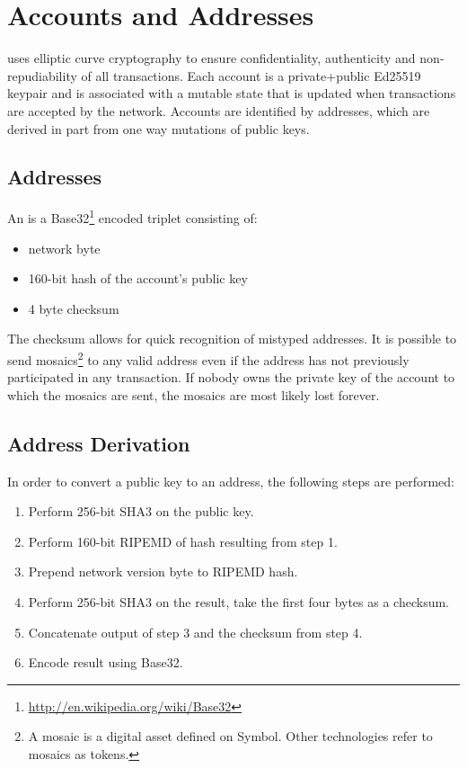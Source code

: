 \section{Accounts and Addresses}
\label{sec:accounts}


\codenamechapterfirstword uses elliptic curve cryptography to ensure confidentiality, authenticity and non-repudiability of all transactions.
Each account is a private+public Ed25519 keypair  and is associated with a mutable state that is updated when transactions are accepted by the network.
Accounts are identified by addresses, which are derived in part from one way mutations of public keys.

\subsection{Addresses}

An  is a Base32\footnote{ \url{http://en.wikipedia.org/wiki/Base32} } encoded triplet consisting of:
\begin{itemize}
	\item{network byte}
	\item{160-bit hash of the account's public key}
	\item{4 byte checksum}
\end{itemize}

The checksum allows for quick recognition of mistyped addresses.
It is possible to send mosaics\footnote{A mosaic is a digital asset defined on Symbol. Other technologies refer to mosaics as tokens.}
to any valid address even if the address has not previously participated in any transaction.
If nobody owns the private key of the account to which the mosaics are sent, the mosaics are most likely lost forever.

\subsection{Address Derivation}
In order to convert a public key to an address, the following steps are performed:
\begin{enumerate}
	\item{Perform 256-bit SHA3 on the public key.}
	\item{Perform 160-bit RIPEMD of hash resulting from step 1.}
	\item{Prepend network version byte to RIPEMD hash.}
	\item{Perform 256-bit SHA3 on the result, take the first four bytes as a checksum.}
	\item{Concatenate output of step 3 and the checksum from step 4.}
	\item{Encode result using Base32.}
\end{enumerate}

